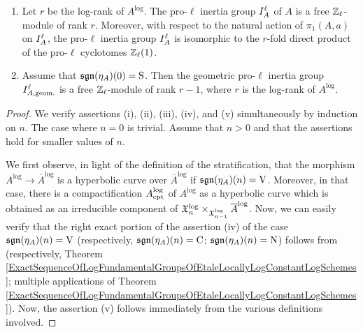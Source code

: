 \begin{prop}
\begin{enumerate}
    \item Let $r$ be the log-rank of $A^\log$. The pro-$\ell$ inertia group $I^{\ell}_{A}$ of $A$ is a free $\mathbb{Z}_\ell$-module of rank $r$. Moreover, with respect to the natural action of $\pi_1(A, a)$ on $I^{\ell}_{A}$, the pro-$\ell$ inertia group $I^{\ell}_{A}$ is isomorphic to the $r$-fold direct product of the pro-$\ell$ cyclotomes $\mathbb{Z}_\ell(1)$.
    \item Assume that $\mathfrak{sgn}(\eta_A)(0) = \mathrm{S}$. Then the geometric pro-$\ell$ inertia group $I^{\ell}_{A, \text{geom.}}$ is a free $\mathbb{Z}_\ell$-module of rank $r - 1$, where $r$ is the log-rank of $A^\log$.
  \end{enumerate}
\end{prop}
\begin{proof}
  We verify assertions (i), (ii), (iii), (iv), and (v) simultaneously by induction on $n$. The case where $n = 0$ is trivial. Assume that $n > 0$ and that the assertions hold for smaller values of $n$.

  We first observe, in light of the definition of the stratification, that the morphism $A^\log \to \overline{A}^\log$ is a hyperbolic curve over $\overline{A}^\log$ if $\mathfrak{sgn}(\eta_A)(n) = \mathrm{V}$. Moreover, in that case, there is a compactification $A^{\mathrm{log}}_{\mathrm{cpt}}$ of $A^\log$ as a hyperbolic curve which is obtained as an irreducible component of $\mathfrak{X}^{\mathrm{log}}_n \times_{\mathfrak{X}^{\mathrm{log}}_{n - 1}} \overline{A}^{\mathrm{log}}$. Now, we can easily verify that the right exact portion of the assertion (iv) of the case $\mathfrak{sgn}(\eta_A)(n) = \mathrm{V}$ (respectively, $\mathfrak{sgn}(\eta_A)(n) = \mathrm{C}$; $\mathfrak{sgn}(\eta_A)(n) = \mathrm{N}$) follows from \cite[Theorem 2]{Hoshi1} (respectively, Theorem \ref{ExactSequenceOfLogFundamentalGroupsOfEtaleLocallyLogConstantLogSchemes}; multiple applications of Theorem \ref{ExactSequenceOfLogFundamentalGroupsOfEtaleLocallyLogConstantLogSchemes}). Now, the assertion (v) follows immediately from the various definitions involved.


\end{proof}

